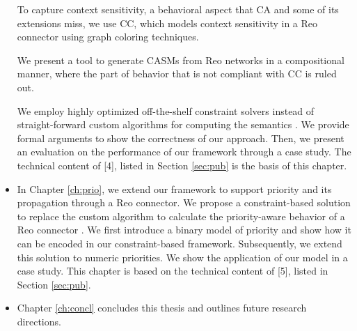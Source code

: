 \begin{itemize}
To capture context sensitivity, a behavioral aspect that CA and some of its extensions miss, we use CC, which models context sensitivity in a Reo connector using graph coloring techniques.

We present a tool to generate CASMs from Reo networks in a compositional manner, where the part of behavior that is not compliant with CC is ruled out. 

We employ highly optimized off-the-shelf constraint solvers instead of straight-forward custom algorithms for computing the semantics \cite{behconstraint}. We provide formal arguments to show the correctness of our approach. Then, we present an evaluation on the performance of our framework through a case study. The technical content of [4], listed in Section \ref{sec:pub} is the basis of this chapter.

%

\item In Chapter \ref{ch:prio}, we extend our framework to support priority and its propagation through a Reo connector. We propose a constraint-based solution to replace the custom algorithm to calculate the priority-aware behavior of a Reo connector \cite{fsen19}. We first introduce a binary model of priority and show how it can be encoded in our constraint-based framework. Subsequently, we extend this solution to numeric priorities. We show the application of our model in a case study. This chapter is based on the technical content of [5], listed in Section \ref{sec:pub}.

\item Chapter \ref{ch:concl} concludes this thesis and outlines future research directions. 
\end{itemize}

